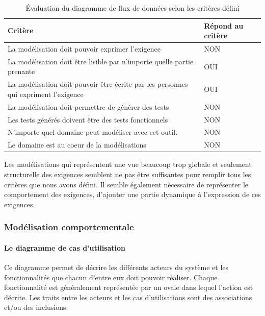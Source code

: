         \begin{table}[H]
        \centering
         \begin{tabular}{|p{25em}|p{5em}|} 
         \hline
        Critère & Répond au critère \\ [0.5ex] 
         \hline
         La modélisation doit pouvoir exprimer l’exigence & \cellcolor[HTML]{D03737}NON\\
         \hline
        La modélisation doit être lisible par n’importe quelle partie prenante & \cellcolor[HTML]{699A73}OUI\\
         \hline
        La modélisation doit pouvoir être écrite par les personnes qui expriment l’exigence &\cellcolor[HTML]{699A73} OUI \\
         \hline
        La modélisation doit permettre de générer des tests & \cellcolor[HTML]{D03737}NON \\
         \hline
        Les tests générés doivent être des tests fonctionnels &\cellcolor[HTML]{D03737} NON\\ 
         \hline
        N’importe quel domaine peut modéliser avec cet outil.&\cellcolor[HTML]{D03737} NON\\ 
         \hline
        Le domaine est au coeur de la modélisations &\cellcolor[HTML]{D03737} NON\\ 
        \hline 
        \end{tabular}
        \caption{Évaluation du diagramme de flux de données selon les critères défini}
        \end{table}

        Les modélisations qui représentent une vue beaucoup trop globale et seulement structurelle des exigences semblent ne pas être suffisantes pour remplir tous les critères que nous avons défini. Il semble également nécessaire de représenter le comportement des exigences, d'ajouter une partie dynamique à l'expression de ces exigences. 
        
        \subsubsection{Modélisation comportementale}

        \paragraph{Le diagramme de cas d'utilisation}

        Ce diagramme permet de décrire les différents acteurs du système et les fonctionnalités que chacun d'entre eux doit pouvoir réaliser. Chaque fonctionnalité est généralement représentée par un ovale dans lequel l'action est décrite. Les traits entre les acteurs et les cas d'utilisations sont des associations et/ou des inclusions. 


